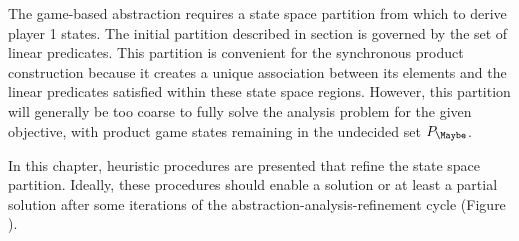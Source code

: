 The game-based abstraction requires a state space partition from which to derive player 1 states.
The initial partition described in section  is governed by the set of linear predicates.
This partition is convenient for the synchronous product construction because it creates a unique association between its elements and the linear predicates satisfied within these state space regions.
However, this partition will generally be too coarse to fully solve the analysis problem for the given objective, with product game states remaining in the undecided set $P_\Maybe$.

In this chapter, heuristic procedures are presented that refine the state space partition.
Ideally, these procedures should enable a solution or at least a partial solution after some iterations of the abstraction-analysis-refinement cycle (Figure ).

